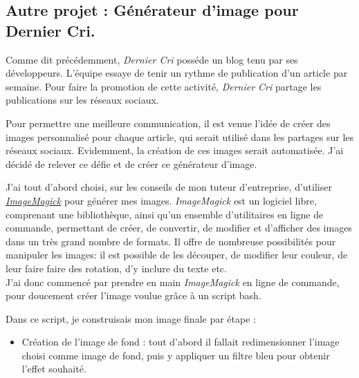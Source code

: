\documentclass[12pt,a4paper]{article}
\providecommand{\tightlist}{%
  \setlength{\itemsep}{0pt}\setlength{\parskip}{0pt}}
\begin{document}
  \bigskip

  \subsection{Autre projet : Générateur d'image pour Dernier
  Cri.}\label{autre-projet-guxe9nuxe9rateur-dimage-pour-dernier-cri.}

  \bigskip

  Comme dit précédemment, \emph{Dernier Cri} posséde un blog tenu par ses
  développeurs. L'équipe essaye de tenir un rythme de publication d'un
  article par semaine. Pour faire la promotion de cette activité,
  \emph{Dernier Cri} partage les publications sur les réseaux sociaux.

  \bigskip

  Pour permettre une meilleure communication, il est venue l'idée de créer
  des images personnalisé pour chaque article, qui serait utilisé dans les
  partages sur les réseaux sociaux. Evidemment, la création de ces images
  serait automatisée. J'ai décidé de relever ce défie et de créer ce
  générateur d'image.

  \bigskip

  J'ai tout d'abord choisi, sur les conseils de mon tuteur d'entreprise,
  d'utiliser
  \href{https://www.imagemagick.org/script/index.php}{\emph{ImageMagick}}
  pour générer mes images. \emph{ImageMagick} est un logiciel libre,
  comprenant une bibliothèque, ainsi qu'un ensemble d'utilitaires en ligne
  de commande, permettant de créer, de convertir, de modifier et
  d'afficher des images dans un très grand nombre de formats. Il offre de
  nombreuse possibilités pour manipuler les images: il est possible de les
  découper, de modifier leur couleur, de leur faire faire des rotation,
  d'y inclure du texte etc.\\
  J'ai donc commencé par prendre en main \emph{ImageMagick} en ligne de
  commande, pour doucement créer l'image voulue grâce à un script bash.

  \bigskip

  Dans ce script, je construisais mon image finale par étape :

  \begin{itemize}
  \tightlist
  \item
    Création de l'image de fond : tout d'abord il fallait redimensionner
    l'image choisi comme image de fond, puis y appliquer un filtre bleu
    pour obtenir l'effet souhaité.
  \end{itemize}
\end{document}
